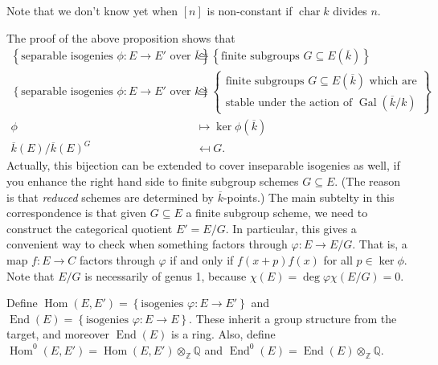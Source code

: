 Note that we don't know yet when \( [n] \) is non-constant if \( \operatorname{char} k  \) divides \( n \).
\begin{remark}
  The proof of the above proposition shows that
  \begin{align*}
    \left\lbrace \text{separable isogenies } \phi \colon E \to E' \text{ over } \overline{k} \right\rbrace & \cong \left\lbrace \text{finite subgroups } G \subseteq E( \overline{k} ) \right\rbrace \\
    \left\lbrace \text{separable isogenies } \phi \colon E \to E' \text{ over } k \right\rbrace & \cong \left\lbrace \begin{array}{l} \text{finite subgroups } G \subseteq E( \overline{k} ) \text{ which are} \\
                                                                                                                       \text{stable under the action of } \operatorname{Gal} ( \overline{k}/k ) \end{array}  \right\rbrace \\
    \phi & \mapsto \ker \phi ( \overline{k} ) \\
    \overline{k}(E) / \overline{k}(E)^G & \mapsfrom G .
  \end{align*}
  Actually, this bijection can be extended to cover inseparable isogenies as well, if you enhance the right hand side to finite subgroup schemes \( G \subseteq E \).
  (The reason is that \textit{reduced} schemes are determined by \( \overline{k} \)-points.)
  The main subtelty in this correspondence is that given \( G \subseteq E \) a finite subgroup scheme, we need to construct the categorical quotient \( E' = E/G \).
  In particular, this gives a convenient way to check when something factors through \( \varphi \colon E \to E/G \).
  That is, a map \( f \colon E \to C \) factors through \( \varphi \) if and only if \( f(x+p) f(x) \) for all \( p \in \ker \phi \).
  Note that \( E/G \) is necessarily of genus 1, because \( \chi(E) = \operatorname{deg} \varphi \chi(E/G) = 0 \).
\end{remark}
\begin{definition}
  Define \( \operatorname{Hom} \left( E,E' \right) = \left\lbrace \text{isogenies } \varphi \colon E \to E' \right\rbrace \) and \( \operatorname{End}(E) = \left\lbrace \text{isogenies } \varphi \colon E \to E \right\rbrace \).
  These inherit a group structure from the target, and moreover \( \operatorname{End}(E) \) is a ring.
  Also, define \( \operatorname{Hom}^0 \left( E,E' \right) = \operatorname{Hom} \left( E,E' \right) \otimes_{\mathbb{Z}} \mathbb{Q} \) and \( \operatorname{End}^0 \left( E \right) = \operatorname{End}(E) \otimes_{\mathbb{Z}} \mathbb{Q} \).
\end{definition}
